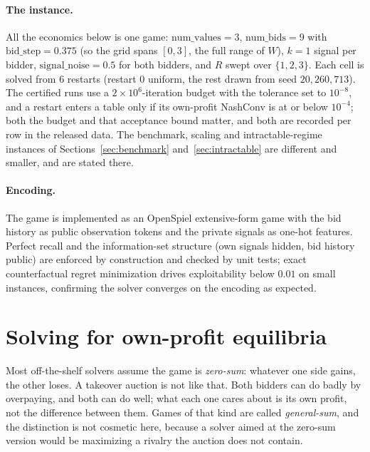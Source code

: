 \documentclass[11pt,a4paper]{article}
\begin{document}
\paragraph{The instance.} All the economics below is one game: $\mathrm{num\_values}=3$, $\mathrm{num\_bids}=9$ with $\mathrm{bid\_step}=0.375$ (so the grid spans $[0,3]$, the full range of $W$), $k=1$ signal per bidder, $\mathrm{signal\_noise}=0.5$ for both bidders, and $R$ swept over $\{1,2,3\}$. Each cell is solved from $6$ restarts (restart $0$ uniform, the rest drawn from seed $20{,}260{,}713$). The certified runs use a $2\times10^{6}$-iteration budget with the tolerance set to $10^{-8}$, and a restart enters a table only if its own-profit NashConv is at or below $10^{-4}$; both the budget and that acceptance bound matter, and both are recorded per row in the released data. The benchmark, scaling and intractable-regime instances of Sections~\ref{sec:benchmark} and~\ref{sec:intractable} are different and smaller, and are stated there.

\paragraph{Encoding.} The game is implemented as an OpenSpiel \citep{openspiel2019} extensive-form game with the bid history as public observation tokens and the private signals as one-hot features. Perfect recall and the information-set structure (own signals hidden, bid history public) are enforced by construction and checked by unit tests; exact counterfactual regret minimization drives exploitability below $0.01$ on small instances, confirming the solver converges on the encoding as expected.

\section{Solving for own-profit equilibria}

Most off-the-shelf solvers assume the game is \emph{zero-sum}: whatever one side gains, the other loses. A takeover auction is not like that. Both bidders can do badly by overpaying, and both can do well; what each one cares about is its own profit, not the difference between them. Games of that kind are called \emph{general-sum}, and the distinction is not cosmetic here, because a solver aimed at the zero-sum version would be maximizing a rivalry the auction does not contain.
\end{document}
